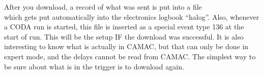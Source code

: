 {\par

After you download, a record of what was sent is put into a file \\ 
which gets put automatically into the electronics 
logbook ``halog''.   Also, whenever a CODA run is 
started, this file is inserted as a special event 
type 136 at the start of run.   This will be the 
setup IF the download was successful.   It is also 
interesting to know what is actually in CAMAC, but 
that can only be done in expert mode, and the delays
cannot be read from CAMAC.
The simplest way to be sure about what is in the 
trigger is to download again. 

} %

%
%
%
%
%
%
%
